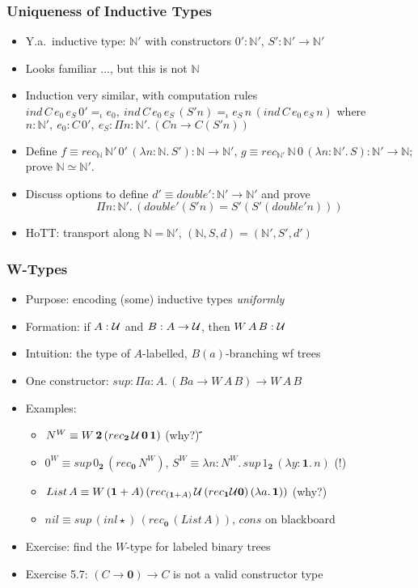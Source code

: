 \documentclass[handout]{beamer}
\newcommand{\depi}[3]{\Pi{#1{:}#2.\,#3}}
\newcommand{\lam}[2]{\lambda{#1.\,#2}}
\newcommand{\lamt}[3]{\lambda{#1{:}#2.\,#3}}
\newcommand{\Nat}{\mathbb{N}}
\newcommand{\UU}{{\cal U}}
\newcommand{\bfnull}{\mathbf{0}}
\newcommand{\bfone}{\mathbf{1}}
\newcommand{\bftwo}{\mathbf{2}}
\begin{document}
\frame
  {
    \frametitle{Uniqueness of Inductive Types}

    \begin{itemize}[<+->]
    \item Y.a.\ inductive type: $\Nat'$ with constructors $0':\Nat'$, $S' : \Nat'\to\Nat'$
    \item Looks familiar ..., but this is not $\Nat$
    \item Induction very similar, with computation rules
      $ind\, C\, e_0\, e_S\, 0' =_\iota e_0, ~ind\,C\,e_0\,e_S\,(S' n) =_\iota e_S\,n\,(ind\,C\,e_0\,e_S\,n)$
      where  $n:\Nat',~e_0 : C\,0', ~e_S : \depi{n}{\Nat'}{({Cn}\to{C(S'n)})}$
    \item Define $f \equiv rec_{\Nat}\,\Nat'\,0'\,(\lamt{n}{\Nat}{S'}): \Nat\to\Nat'$, 
     $g \equiv rec_{\Nat'}\,\Nat\,0\,(\lamt{n}{\Nat'}{S}): \Nat'\to\Nat$; prove $\Nat\simeq\Nat'$.
    \item Discuss options to define $d'\equiv double':\Nat'\to\Nat'$ and prove 
    \[\depi{n}{\Nat'}{(double'(S' n) = S'(S' (double' n)))}\]
    \item HoTT: transport along $\Nat=\Nat'$, $(\Nat,S,d)=(\Nat',S',d')$
    \end{itemize}
  }


\frame
  {
    \frametitle{W-Types}

    \begin{itemize}[<+->]
    \item Purpose: encoding (some) inductive types \emph{uniformly}
    \item Formation: if $A:\UU$ and $B:A\to\UU$, then $W\,A\,B :\UU$
    \item Intuition: the type of $A$-labelled, $B(a)$-branching wf trees
    \item One constructor: $sup:\depi{a}{A}{(Ba\to W\,A\,B)\to W\,A\,B}$
    \item Examples:
      \begin{itemize}[<+->]
      \item $N^W \equiv W\,\bftwo\,(rec_{\bftwo}\,\UU\,\bfnull\,\bfone)$ (why?)      
      ̈́\item $0^W \equiv sup\,0_{\bftwo}\,(rec_{\bfnull}\,N^W)$, 
               $S^W \equiv \lamt{n}{N^W}{sup\,1_{\bftwo}\,(\lamt{y}{\bfone}{n})}$ (!)
      \item $List\,A \equiv W\,(\bfone+A)\,(rec_{(\bfone+A)}\,\UU\,(rec_{\bfone}\UU\bfnull)\,(\lam{a}{\bfone}))$ (why?)
      \item $nil \equiv sup\,(inl\star)\,(rec_{\bfnull}\,(List\,A))$, $cons$ on blackboard
      \end{itemize}    
    \item Exercise: find the $W$-type for labeled binary trees
    \item Exercise 5.7: $(C\to\bfnull)\to C$ is not a valid constructor type
    \end{itemize}
  }
\end{document}
